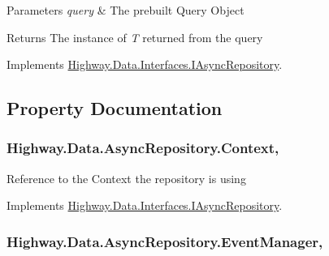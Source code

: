 \begin{DoxyParams}{Parameters}
{\em query} & The prebuilt Query Object\\
\hline
\end{DoxyParams}
\begin{DoxyReturn}{Returns}
The instance of {\itshape T}  returned from the query
\end{DoxyReturn}


Implements \hyperlink{interface_highway_1_1_data_1_1_interfaces_1_1_i_async_repository_a7eed1d89c1104a467bfdc12cb0de3133}{Highway.\-Data.\-Interfaces.\-I\-Async\-Repository}.



\subsection{Property Documentation}
\hypertarget{class_highway_1_1_data_1_1_async_repository_abfd6073ad2ad20eebaf97568c7ed8d7e}{
\subsubsection[{Context}]{ Highway.\-Data.\-Async\-Repository.\-Context\hspace{0.3cm}{\ttfamily [get]}, {\ttfamily [set]}}}\label{class_highway_1_1_data_1_1_async_repository_abfd6073ad2ad20eebaf97568c7ed8d7e}


Reference to the Context the repository is using 



Implements \hyperlink{interface_highway_1_1_data_1_1_interfaces_1_1_i_async_repository_a03e1d3bb759c50309a4be719eca25a0f}{Highway.\-Data.\-Interfaces.\-I\-Async\-Repository}.

\hypertarget{class_highway_1_1_data_1_1_async_repository_ab41ad1eec675e831aba15b677d27717e}{
\subsubsection[{Event\-Manager}]{ Highway.\-Data.\-Async\-Repository.\-Event\-Manager\hspace{0.3cm}{\ttfamily [get]}, {\ttfamily [set]}}}\label{class_highway_1_1_data_1_1_async_repository_ab41ad1eec675e831aba15b677d27717e}


